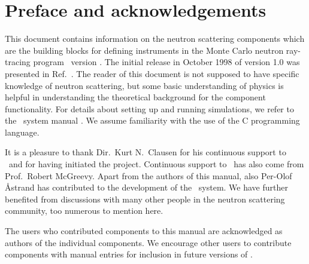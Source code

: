 
\chapter*{Preface and acknowledgements}
This document contains information on the neutron scattering components
which are the building blocks for defining instruments
in the Monte Carlo neutron
ray-tracing program \MCS\ version \version . The initial
release in October 1998 of version 1.0 was presented in Ref.~\cite{nn_10_20}.
The reader of this
document is not supposed to have specific knowledge of neutron scattering,
but some basic understanding of physics is helpful in
understanding the theoretical background for the component functionality.
For details about setting up and running simulations, we refer to
the \MCS\ system manual \cite{mcstasmanual}.
We assume familiarity with the use of
the C programming language.


It is a pleasure to thank Dir.~Kurt N.~Clausen for his continuous
support to \MCS\ and for having initiated the project.
Continuous support to \MCS\ has also come from Prof.~Robert McGreevy.
Apart from the authors of this manual,
also Per-Olof \AA strand has contributed to the development of the \MCS\ system.
We have further benefited
from discussions with many other people in the neutron scattering
community, too numerous to mention here.

The users who contributed components to this manual are acknowledged
as authors of the individual components. We encourage other
users to contribute components with manual entries for inclusion in
future versions of \MCS.

